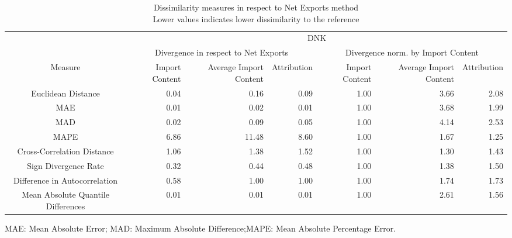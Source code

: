 \begin{table}[t]
\caption*{
{\large Dissimilarity measures in respect to Net Exports method} \\ 
{\small Lower values indicates lower dissimilarity to the reference}
} 
\fontsize{15.0pt}{18.0pt}\selectfont
\begin{tabular*}{\linewidth}{@{\extracolsep{\fill}}crrrrrr}
\toprule
 & \multicolumn{6}{c}{DNK} \\ 
\cmidrule(lr){2-7}
 & \multicolumn{3}{c}{Divergence in respect to Net Exports} & \multicolumn{3}{c}{Divergence norm. by Import Content} \\ 
\cmidrule(lr){2-4} \cmidrule(lr){5-7}
Measure & Import Content & Average Import Content & Attribution & Import Content & Average Import Content & Attribution \\ 
\midrule\addlinespace[2.5pt]
Euclidean Distance & 0.04 & 0.16 & 0.09 & 1.00 & 3.66 & 2.08 \\ 
MAE & 0.01 & 0.02 & 0.01 & 1.00 & 3.68 & 1.99 \\ 
MAD & 0.02 & 0.09 & 0.05 & 1.00 & 4.14 & 2.53 \\ 
MAPE & 6.86 & 11.48 & 8.60 & 1.00 & 1.67 & 1.25 \\ 
Cross-Correlation Distance & 1.06 & 1.38 & 1.52 & 1.00 & 1.30 & 1.43 \\ 
Sign Divergence Rate & 0.32 & 0.44 & 0.48 & 1.00 & 1.38 & 1.50 \\ 
Difference in Autocorrelation & 0.58 & 1.00 & 1.00 & 1.00 & 1.74 & 1.73 \\ 
Mean Absolute Quantile Differences & 0.01 & 0.01 & 0.01 & 1.00 & 2.61 & 1.56 \\ 
\bottomrule
\end{tabular*}
\begin{minipage}{\linewidth}
MAE: Mean Absolute Error; MAD: Maximum Absolute Difference;MAPE: Mean Absolute Percentage Error.\\
\end{minipage}
\end{table}

